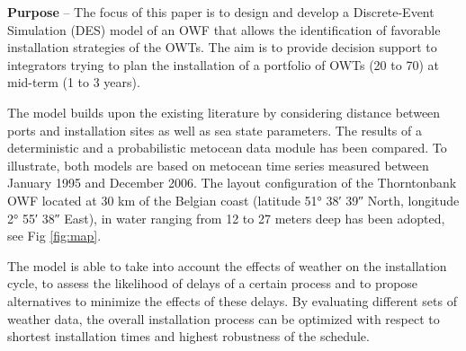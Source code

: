 \textbf{Purpose} --
The focus of this paper is to design and develop a Discrete-Event Simulation (DES) model of an OWF that allows the identification of favorable installation strategies of the OWTs. The aim is to provide decision support to integrators trying to plan the installation of a portfolio of OWTs (20 to 70) at mid-term (1 to 3 years).


The model builds upon the existing literature by considering distance between ports and installation sites as well as sea state parameters. The results of a deterministic and a probabilistic metocean data module has been compared. To illustrate, both models are based on metocean time series measured between January 1995 and December 2006. The layout configuration of the Thorntonbank OWF located at 30 km of the Belgian coast (latitude 51° 38′ 39″ North, longitude 2° 55′ 38″ East), in water ranging from 12 to 27 meters deep has been adopted, see Fig \ref{fig:map}.

The model is able to take into account the effects of weather on the installation cycle, to assess the likelihood of delays of a certain process and to propose alternatives to minimize the effects of these delays. By evaluating different sets of weather data, the overall installation process can be optimized with respect to shortest installation times and highest robustness of the schedule. %


